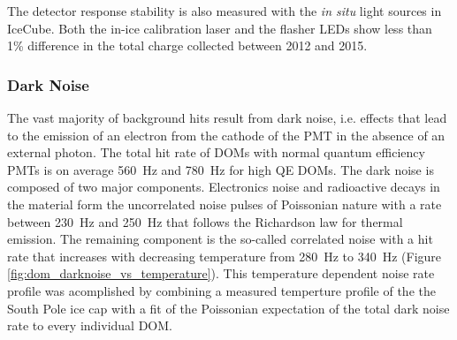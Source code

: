The detector response stability is also measured with the {\it in
  situ} light sources in IceCube. Both the in-ice calibration laser
\cite{IC3:SC} and the flasher LEDs show less than 1\% difference in the total
charge collected between 2012 and 2015. 

\subsubsection{\label{sect:darknoise}Dark Noise}


The vast majority of background hits result from dark noise, i.e. effects that lead to the emission of an electron from the cathode of the PMT in the absence of an external photon. The total hit rate of DOMs with normal quantum efficiency PMTs is on average \SI{560}{\hertz} and \SI{780}{\hertz} for high QE DOMs. 
The dark noise is composed of two major components. Electronics noise and radioactive decays in the material form the uncorrelated noise pulses of Poissonian nature with a rate between \SI{230}{\hertz} and \SI{250}{\hertz} that follows the Richardson law for thermal emission. 
The remaining component is the so-called correlated noise
with a hit rate that increases with decreasing temperature from \SI{280}{\hertz} to \SI{340}{\hertz} (Figure \ref{fig:dom_darknoise_vs_temperature}). 
This temperature dependent noise rate profile was acomplished by combining a measured temperture profile of the the South Pole ice cap \cite{price2002temperature} with a fit of the Poissonian expectation of the total dark noise rate to every individual DOM.

